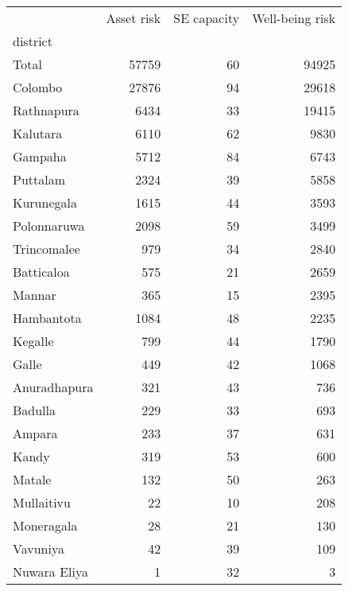 \begin{tabular}{lrrr}
\toprule
{} &  Asset risk &  SE capacity &  Well-being risk \\
district     &             &              &                  \\
\midrule
Total        &       57759 &           60 &            94925 \\
Colombo      &       27876 &           94 &            29618 \\
Rathnapura   &        6434 &           33 &            19415 \\
Kalutara     &        6110 &           62 &             9830 \\
Gampaha      &        5712 &           84 &             6743 \\
Puttalam     &        2324 &           39 &             5858 \\
Kurunegala   &        1615 &           44 &             3593 \\
Polonnaruwa  &        2098 &           59 &             3499 \\
Trincomalee  &         979 &           34 &             2840 \\
Batticaloa   &         575 &           21 &             2659 \\
Mannar       &         365 &           15 &             2395 \\
Hambantota   &        1084 &           48 &             2235 \\
Kegalle      &         799 &           44 &             1790 \\
Galle        &         449 &           42 &             1068 \\
Anuradhapura &         321 &           43 &              736 \\
Badulla      &         229 &           33 &              693 \\
Ampara       &         233 &           37 &              631 \\
Kandy        &         319 &           53 &              600 \\
Matale       &         132 &           50 &              263 \\
Mullaitivu   &          22 &           10 &              208 \\
Moneragala   &          28 &           21 &              130 \\
Vavuniya     &          42 &           39 &              109 \\
Nuwara Eliya &           1 &           32 &                3 \\
\bottomrule
\end{tabular}
